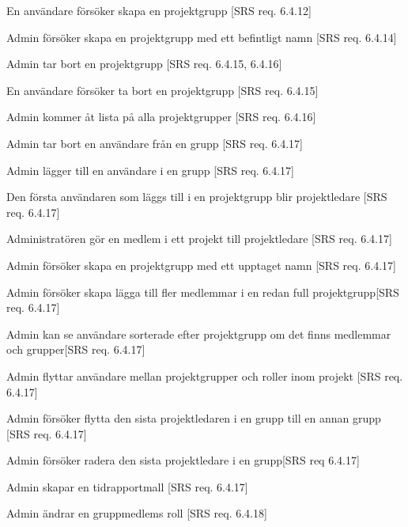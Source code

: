 \documentclass[a4paper]{article}
\begin{document}
\begin{appendices}
\begin{FT}
\item
En användare försöker skapa en projektgrupp [SRS req. 6.4.12]

\item 
Admin försöker skapa en projektgrupp med ett befintligt namn [SRS req. 6.4.14]

\item
Admin tar bort en projektgrupp [SRS req. 6.4.15, 6.4.16]

\item
En användare försöker ta bort en projektgrupp [SRS req. 6.4.15]

\item 
Admin kommer åt lista på alla projektgrupper [SRS req. 6.4.16]

\item
Admin tar bort en användare från en grupp [SRS req. 6.4.17]

\item
Admin lägger till en användare i en grupp [SRS req. 6.4.17]

\item
Den första användaren som läggs till i en projektgrupp blir projektledare [SRS req. 6.4.17]

\item
Administratören gör en medlem i ett projekt till projektledare [SRS req. 6.4.17]

\item
Admin försöker skapa en projektgrupp med ett upptaget namn [SRS req. 6.4.17]

\item 
Admin försöker skapa lägga till fler medlemmar i en redan full projektgrupp[SRS req. 6.4.17]

\item
Admin kan se användare sorterade efter projektgrupp om det finns medlemmar och grupper[SRS req. 6.4.17]

\item
Admin flyttar användare mellan projektgrupper och roller inom projekt [SRS req. 6.4.17]

\item 
Admin försöker flytta den sista projektledaren i en grupp  till en annan grupp [SRS req. 6.4.17]

\item
Admin försöker radera den sista projektledare i en grupp[SRS req 6.4.17]

\item 
Admin skapar en tidrapportmall [SRS req. 6.4.17]

\item
Admin ändrar en gruppmedlems roll [SRS req. 6.4.18]


\end{FT}
\end{appendices}
\end{document}
